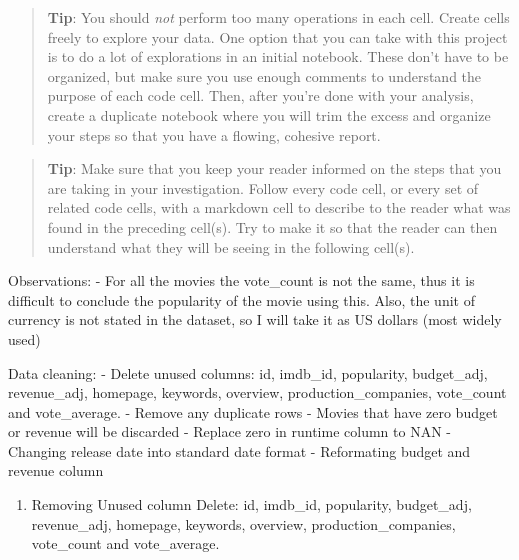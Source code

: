 \documentclass[11pt]{article}
\providecommand{\tightlist}{%
      \setlength{\itemsep}{0pt}\setlength{\parskip}{0pt}}
\begin{document}
    \begin{quote}
\textbf{Tip}: You should \emph{not} perform too many operations in each
cell. Create cells freely to explore your data. One option that you can
take with this project is to do a lot of explorations in an initial
notebook. These don't have to be organized, but make sure you use enough
comments to understand the purpose of each code cell. Then, after you're
done with your analysis, create a duplicate notebook where you will trim
the excess and organize your steps so that you have a flowing, cohesive
report.
\end{quote}

\begin{quote}
\textbf{Tip}: Make sure that you keep your reader informed on the steps
that you are taking in your investigation. Follow every code cell, or
every set of related code cells, with a markdown cell to describe to the
reader what was found in the preceding cell(s). Try to make it so that
the reader can then understand what they will be seeing in the following
cell(s).
\end{quote}

Observations: - For all the movies the vote\_count is not the same, thus
it is difficult to conclude the popularity of the movie using this.
Also, the unit of currency is not stated in the dataset, so I will take
it as US dollars (most widely used)

Data cleaning: - Delete unused columns: id, imdb\_id, popularity,
budget\_adj, revenue\_adj, homepage, keywords, overview,
production\_companies, vote\_count and vote\_average. - Remove any
duplicate rows - Movies that have zero budget or revenue will be
discarded - Replace zero in runtime column to NAN - Changing release
date into standard date format - Reformating budget and revenue column

    \begin{enumerate}
\def\labelenumi{\arabic{enumi}.}
\tightlist
\item
  Removing Unused column Delete: id, imdb\_id, popularity, budget\_adj,
  revenue\_adj, homepage, keywords, overview, production\_companies,
  vote\_count and vote\_average.
\end{enumerate}
\end{document}
